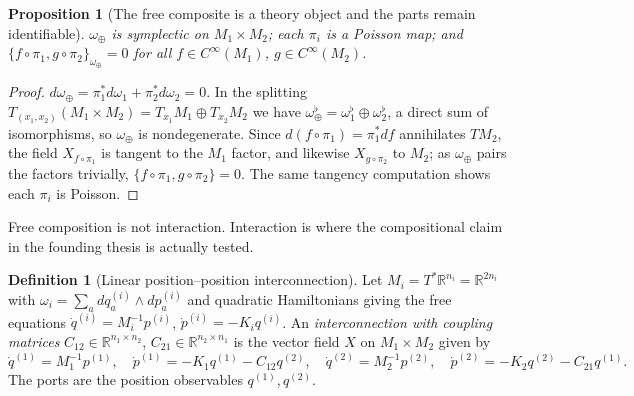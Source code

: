 \documentclass[10pt,a4paper]{article}
\theoremstyle{plain}
\newtheorem{proposition}[theorem]{Proposition}
\theoremstyle{definition}
\newtheorem{definition}[theorem]{Definition}
\newcommand{\Cinf}{C^{\infty}}
\newcommand{\R}{\mathbb{R}}
\newcommand{\PB}[2]{\{#1,#2\}}
\begin{document}
\begin{proposition}[The free composite is a theory object and the parts remain identifiable]
\label{prop:tensorok}
$\omega_\oplus$ is symplectic on $M_1\times M_2$; each $\pi_i$ is a Poisson map; and $\PB{f\circ\pi_1}{g\circ\pi_2}_{\omega_\oplus} = 0$ for all $f \in \Cinf(M_1)$, $g \in \Cinf(M_2)$.
\end{proposition}
\begin{proof}
$d\omega_\oplus = \pi_1^*d\omega_1 + \pi_2^*d\omega_2 = 0$. In the splitting $T_{(x_1,x_2)}(M_1\times M_2) = T_{x_1}M_1\oplus T_{x_2}M_2$ we have $\omega_\oplus^\flat = \omega_1^\flat\oplus\omega_2^\flat$, a direct sum of isomorphisms, so $\omega_\oplus$ is nondegenerate. Since $d(f\circ\pi_1) = \pi_1^*df$ annihilates $TM_2$, the field $X_{f\circ\pi_1}$ is tangent to the $M_1$ factor, and likewise $X_{g\circ\pi_2}$ to $M_2$; as $\omega_\oplus$ pairs the factors trivially, $\PB{f\circ\pi_1}{g\circ\pi_2} = 0$. The same tangency computation shows each $\pi_i$ is Poisson.
\end{proof}

Free composition is not interaction. Interaction is where the compositional claim in the founding thesis is actually tested.

\begin{definition}[Linear position--position interconnection]
\label{def:coupling}
Let $M_i = T^*\R^{n_i} = \R^{2n_i}$ with $\omega_i = \sum_a dq_a^{(i)}\wedge dp^{(i)}_a$ and quadratic Hamiltonians giving the free equations $\dot q^{(i)} = M_i^{-1}p^{(i)}$, $\dot p^{(i)} = -K_i q^{(i)}$. An \emph{interconnection with coupling matrices} $C_{12} \in \R^{n_1\times n_2}$, $C_{21} \in \R^{n_2\times n_1}$ is the vector field $X$ on $M_1\times M_2$ given by
\begin{equation}
\label{eq:coupled}
\dot q^{(1)} = M_1^{-1}p^{(1)},\quad
\dot p^{(1)} = -K_1q^{(1)} - C_{12}q^{(2)},\quad
\dot q^{(2)} = M_2^{-1}p^{(2)},\quad
\dot p^{(2)} = -K_2q^{(2)} - C_{21}q^{(1)}.
\end{equation}
The ports are the position observables $q^{(1)}, q^{(2)}$.
\end{definition}
\end{document}
